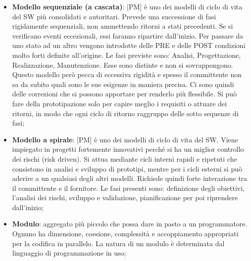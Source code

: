 \begin{itemize}
	\item \textbf{Modello sequenziale (a cascata)}: [PM] è uno dei modelli di ciclo di vita del SW più consolidati e autoritari. Prevede una successione di fasi rigidamente sequenziali, non ammettendo ritorni a stati precedenti. Se si verificano eventi eccezionali, essi faranno ripartire dall'inizio. \newline
Per passare da uno stato ad un altro vengono introdotte delle PRE e delle POST condizioni molto forti definite all'origine. Le fasi previste sono: Analisi, Progettazione, Realizzazione, Manutenzione. Esse sono distinte e non si sovrappongono. \newline
Questo modello però pecca di eccessiva rigidità e spesso il committente non sa da subito quali sono le sue esigenze in maniera precisa.\newline
Ci sono quindi delle correzioni che si possono apportare per renderlo più flessibile. Si può fare della prototipazione solo per capire meglio i requisiti o attuare dei ritorni, in modo che ogni ciclo di ritorno raggruppo delle sotto sequenze di fasi;

	\item \textbf{Modello a spirale}: [PM] è uno dei modelli di ciclo di vita del SW. Viene impiegato in progetti fortemente innovativi perché si ha un miglior controllo dei rischi (risk driven). \newline
Si attua mediante cicli interni rapidi e ripetuti che consistono in analisi e sviluppo di prototipi, mentre per i cicli esterni si può aderire a un qualsiasi degli altri modelli. \newline
Richiede quindi forte interazione tra il committente e il fornitore. Le fasi presenti sono: definizione degli obiettivi, l'analisi dei rischi, sviluppo e validazione, pianificazione per poi riprendere dall'inizio;


	\item \textbf{Modulo}: aggregato più piccolo che possa dare in pasto a un programmatore. Ognuno ha dimensione, coesione, complessità e accoppiamento appropriati per la codifica in parallelo. La natura di un modulo è determinata dal linguaggio di programmazione in uso;


\end{itemize}